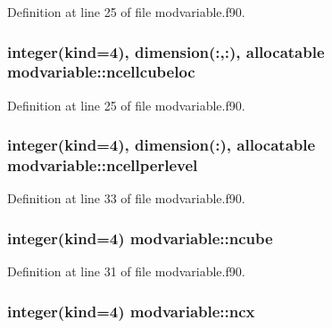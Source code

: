 Definition at line 25 of file modvariable.\+f90.

\subsubsection[{\texorpdfstring{ncellcubeloc}{ncellcubeloc}}]{\setlength{\rightskip}{0pt plus 5cm}integer(kind=4), dimension(\+:,\+:), allocatable modvariable\+::ncellcubeloc}\hypertarget{namespacemodvariable_ac90972e5c9f0aa13073f9f1f6f9cf879}{}\label{namespacemodvariable_ac90972e5c9f0aa13073f9f1f6f9cf879}


Definition at line 25 of file modvariable.\+f90.

\subsubsection[{\texorpdfstring{ncellperlevel}{ncellperlevel}}]{\setlength{\rightskip}{0pt plus 5cm}integer(kind=4), dimension(\+:), allocatable modvariable\+::ncellperlevel}\hypertarget{namespacemodvariable_ab27c6baa1a2f6fe45974edb46a27bd93}{}\label{namespacemodvariable_ab27c6baa1a2f6fe45974edb46a27bd93}


Definition at line 33 of file modvariable.\+f90.

\subsubsection[{\texorpdfstring{ncube}{ncube}}]{\setlength{\rightskip}{0pt plus 5cm}integer(kind=4) modvariable\+::ncube}\hypertarget{namespacemodvariable_a718efb76ffcda6b833e85642669fd01e}{}\label{namespacemodvariable_a718efb76ffcda6b833e85642669fd01e}


Definition at line 31 of file modvariable.\+f90.

\subsubsection[{\texorpdfstring{ncx}{ncx}}]{\setlength{\rightskip}{0pt plus 5cm}integer(kind=4) modvariable\+::ncx}\hypertarget{namespacemodvariable_af74891a7a77b7407b68129d1e9778f21}{}\label{namespacemodvariable_af74891a7a77b7407b68129d1e9778f21}


